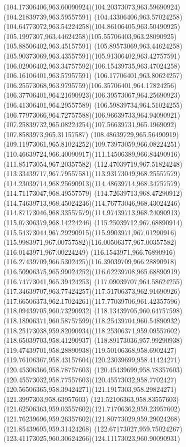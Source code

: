 {{\curveto(104.17306406,963.60090924)(104.20373073,963.59690924)(104.21839739,963.59557591)
\curveto(104.43306406,963.57024258)(104.64773072,963.54224258)(104.86106405,963.50490925)
\curveto(105.1997307,963.44624258)(105.55706403,963.28090925)(105.88506402,963.45157591)
\curveto(105.89573069,963.44624258)(105.90373069,963.43557591)(105.91306402,963.42757591)
\curveto(106.02906402,963.34757592)(106.15439735,963.47024258)(106.16106401,963.57957591)
\curveto(106.17706401,963.80624257)(106.25573068,963.9795759)(106.35706401,964.17824256)
\curveto(106.37706401,964.21690923)(106.39573067,964.25690923)(106.41306401,964.29557589)
\curveto(106.59839734,964.51024255)(106.77973066,964.72757588)(106.96639733,964.94090921)
\curveto(107.25839732,965.08224254)(107.56639731,965.1969092)(107.8583973,965.31157587)
\curveto(108.48639729,965.56490919)(109.11973061,965.81024252)(109.73973059,966.08224251)
\curveto(110.46639724,966.40090917)(111.14506389,966.84490916)(111.85173054,967.20357582)
\curveto(112.47039719,967.51824248)(113.33439717,967.79557581)(113.93173049,968.25557579)
\curveto(114.23039714,968.25690913)(114.48639714,968.34757579)(114.71173047,968.49557579)
\curveto(114.72639713,968.47290912)(114.74639713,968.45024246)(114.76773046,968.43024246)
\curveto(114.87173046,968.33557579)(114.97439713,968.24090913)(115.07306379,968.14224246)
\curveto(115.25039712,967.68890914)(115.54373044,967.29290915)(115.9903971,967.01290916)
\curveto(115.9983971,967.00757582)(116.00506377,967.00357582)(116.0143971,967.00224249)
\curveto(116.1543971,966.76890916)(116.27439709,966.5302425)(116.39039709,966.28890918)
\curveto(116.50906375,965.99024252)(116.62239708,965.68890919)(116.74773041,965.39424253)
\curveto(117.09039707,964.58624255)(117.34639707,963.77424257)(117.51706373,962.91690926)
\curveto(117.66506373,962.17024261)(117.77039706,961.42357596)(118.09439705,960.73290932)
\curveto(118.13439705,960.64757598)(118.18906371,960.58757599)(118.25439704,960.54890932)
\curveto(118.25173038,959.82090934)(118.25306371,959.09557602)(118.65039703,958.41290937)
\curveto(118.89173036,957.99290938)(119.47439701,958.28890938)(119.50106368,958.6902427)
\curveto(119.76106367,958.43157604)(120.23039699,958.41424271)(120.45306366,958.78757603)
\curveto(120.45439699,958.78357603)(120.45573032,958.77557603)(120.45573032,958.7702427)
\curveto(120.56506365,958.39424271)(121.1917303,958.29824271)(121.3997303,958.63957603)
\curveto(121.52106363,958.83557603)(121.62506363,959.03557602)(121.71706362,959.23957602)
\curveto(121.76239696,959.26357602)(121.80773029,959.29024268)(121.85439695,959.31424268)
\curveto(122.67173027,959.75024267)(123.41173025,960.30624266)(124.11173023,960.90090931)
}}
